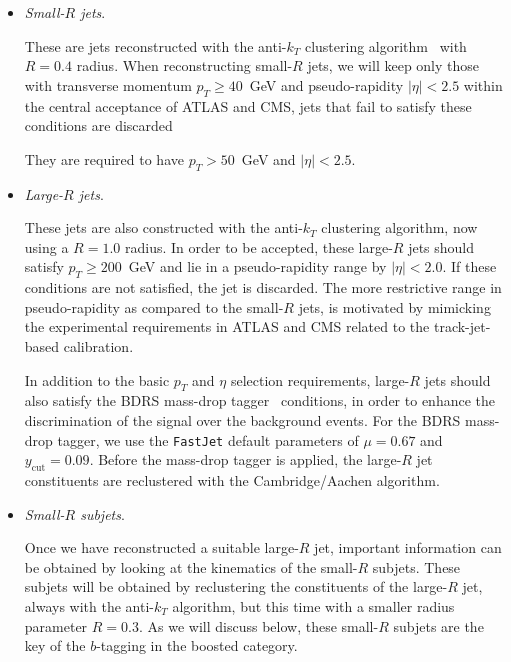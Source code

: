 \begin{itemize}
\item {\it Small-$R$ jets}.

  These are jets  reconstructed with the
  anti-$k_T$ clustering algorithm~\cite{Cacciari:2008gp} with $R=0.4$ radius.
  When reconstructing small-$R$ jets, we will keep only
  those with transverse momentum $p_T \ge 40$~GeV
  and pseudo-rapidity $|\eta|<2.5$ within the central
  acceptance of ATLAS and CMS, jets that fail to satisfy these
  conditions are discarded

  They are required to have $p_T > 50$~GeV and $|\eta|<2.5$.

\item {\it Large-$R$ jets}.

  These jets are also constructed with the
  anti-$k_T$ clustering algorithm, now using a $R=1.0$ radius.
  In order to be accepted, these large-$R$ jets should
  satisfy  $p_T \ge 200$~GeV and lie in a pseudo-rapidity range by
  $|\eta|<2.0$.
  If these conditions are not satisfied, the jet is discarded.
  The more restrictive range  in pseudo-rapidity
  as compared to the small-$R$ jets,
  is motivated by mimicking the  experimental requirements
  in ATLAS and CMS
  related to the track-jet-based calibration.

  In addition to the basic $p_T$ and $\eta$
  selection requirements, large-$R$ jets should also
  satisfy the  BDRS mass-drop tagger~\cite{Butterworth:2008iy}
  conditions, in order
  to enhance the discrimination of the signal over the background
  events.
  For the BDRS mass-drop tagger, we use the {\tt FastJet} default
  parameters of  $\mu = 0.67$ and $y_{\textrm{cut}}= 0.09$.
  Before the mass-drop tagger is applied, the large-$R$ jet
  constituents are reclustered with the Cambridge/Aachen
  algorithm.


  
\item {\it Small-$R$ subjets}.

  Once we have reconstructed a suitable large-$R$ jet, important
  information can be obtained by looking at the kinematics of
  the small-$R$ subjets.
  These subjets will be obtained by reclustering the constituents
  of the large-$R$ jet, always with the  anti-$k_T$ algorithm,
  but this time with a smaller radius parameter $R=0.3$.
  As we will discuss below, these small-$R$ subjets are the key of
  the $b$-tagging in the boosted category.
%
  \end{itemize}


